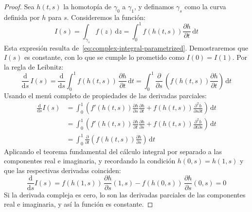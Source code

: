   \begin{proof}
    Sea \(h(t, s)\) la homotopía de \(\gamma_0\) a \(\gamma_1\),
    y definamos \(\gamma_s\) como la curva definida por \(h\)
    para \(s\).
    Consideremos la función:
    \begin{equation*}
      I(s)
	= \int_{\gamma_s} f(z) \, \mathrm{d} z
	= \int_0^1 f(h(t, s)) \frac{\partial h}{\partial t}
	    \, \mathrm{d} t
    \end{equation*}
    Esta expresión
    resulta de~\eqref{eq:complex-integral-parametrized}.
    Demostraremos que \(I(s)\) es constante,
    con lo que se cumple lo prometido como \(I(0) = I(1)\).
    Por la regla de Leibnitz:%
    \begin{equation*}
      \frac{\mathrm{d}}{\mathrm{d} s} \, I(s)
	= \frac{\mathrm{d}}{\mathrm{d} s}
	    \int_0^1 f(h(t, s)) \,
	      \frac{\partial h}{\partial t} \, \mathrm{d} t
	= \int_0^1 \frac{\partial}{\partial s} \,
	    \left(
	      f(h(t, s)) \frac{\partial h}{\partial t}
	    \right)
	    \, \mathrm{d} t
    \end{equation*}
    Usando el menú completo
    de propiedades de las derivadas parciales:
    \begin{align*}
      \frac{\mathrm{d}}{\mathrm{d} s} I(s)
	&= \int_0^1
	     \left(
	       f'(h(t, s))
		 \frac{\partial h}{\partial s}
		     \frac{\partial h}{\partial t}
		 + f(h(t, s))
		     \frac{\partial^2 h}{\partial s \partial t}
	     \right)
	     \, \mathrm{d} t \\
	&= \int_0^1
	     \left(
	       f'(h(t, s))
		 \frac{\partial h}{\partial t}
		    \frac{\partial h}{\partial s}
		 + f(h(t, s))
		    \frac{\partial^2 h}{\partial t \partial s}
	     \right)
	     \, \mathrm{d} t \\
	&= \int_0^1 \frac{\partial}{\partial t}
	     \left(
	       f(h(t, s)) \frac{\partial h}{\partial s}
	     \right)
	     \, \mathrm{d} t
    \end{align*}
    Aplicando el teorema fundamental del cálculo integral%
    por separado a las componentes real e imaginaria,
    y recordando la condición \(h(0, s) = h(1, s)\)
    y que las respectivas derivadas coinciden:
    \begin{equation*}
      \frac{\mathrm{d}}{\mathrm{d} s} I(s)
	= f(h(1, s)) \, \frac{\partial h}{\partial s} (1, s)
	   - f(h(0, s)) \, \frac{\partial h}{\partial s} (0, s)
	= 0
    \end{equation*}
    Si la derivada compleja es cero,
    lo son las derivadas parciales
    de las componentes real e imaginaria,
    y así la función es constante.
  \end{proof}
